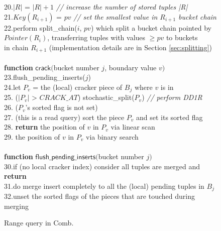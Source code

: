 \begin{figure}[t]
\begin{minipage}{4in}
{\begin{tabbing}
20.\>$|R|$ = $|R|+1$ {\it// increase the number of stored tuples |R|}\\
21.\>$Key(R_{i+1})$ = $pv$ {\it// set the smallest value in $R_{i+1}$ bucket chain}\\
22.\>perform split\_chain($i$, $pv$) which split a bucket chain pointed by\\
\>$Pointer(R_i)$, transferring tuples with values $\geq pv$ to buckets\\
\>in chain $R_{i+1}$ (implementation details are in Section \ref{sec:splitting})\\
\\
{\bf function} $\mathsf{crack}($bucket number $j$, boundary value $v)$\\
23.\>flush\_pending\_inserts($j$)\\
24.\>let $P_v$ = the (local) cracker piece of $B_j$ where $v$ is in\\
25. ($|P_v|$ > $CRACK\_AT$) stochastic\_split($P_v$) {\it// perform DD1R}\\
26. ($P_v$'s sorted flag is not set)\\
27.\> (this is a read query) sort the piece $P_v$ and set its sorted flag\\
28.\> {\bf return} the position of $v$ in $P_v$ via linear scan\\
29. the position of $v$ in $P_v$ via binary search\\
\\
{\bf function} $\mathsf{flush\_pending\_inserts}($bucket number $j)$\\
30.\>if (no local cracker index) consider all tuples are merged and {\bf return}\\
31.\>do merge insert completely to all the (local) pending tuples in $B_j$\\
32.\>unset the sorted flags of the pieces that are touched during merging\\
\end{tabbing}
}
\end{minipage}
\vspace{-1em}
\caption{Range query in Comb.}\label{algo:pointquery}
\vspace{-1.5em}
\end{figure}


